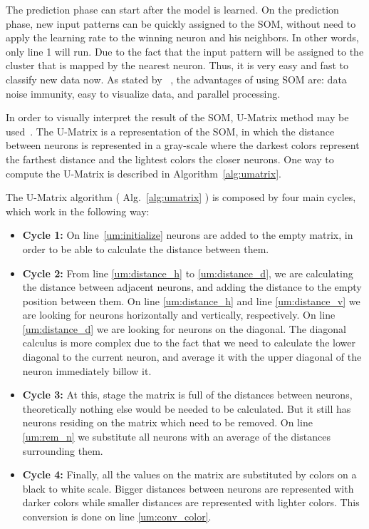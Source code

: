 The prediction phase can start after the model is learned. On the prediction phase, new input patterns can be quickly assigned to the \ac{SOM}, without need to apply the learning rate to the winning neuron and his neighbors. In other words, only line 1 will run. Due to the fact that the input pattern will be assigned to the cluster that is mapped by the nearest neuron. Thus, it is very easy and fast to classify new data now. As stated by ~\citet{Liu2012b}, the advantages of using \ac{SOM} are: data noise immunity, easy to visualize data, and parallel processing.

In order to visually interpret the result of the \ac{SOM}, \ac{U-Matrix} method may be used~\citep{Bacao2005}. The \ac{U-Matrix} is a representation of the \ac{SOM}, in which the distance between neurons is represented in a gray-scale where the darkest colors represent the farthest distance and the lightest colors the closer neurons. One way to compute the \ac{U-Matrix} is described in Algorithm~\ref{alg:umatrix}. 



The \ac{U-Matrix} algorithm ( Alg.~\ref{alg:umatrix} ) is composed by four main cycles, which work in the following way:

\begin{itemize}
  \item \textbf{Cycle 1: } On line~\ref{um:initialize} neurons are added to the empty matrix, in order to be able to calculate the distance between them.
  \item \textbf{Cycle 2:} From line \ref{um:distance_h} to \ref{um:distance_d}, we are calculating the distance between adjacent neurons, and adding the distance to the empty position between them. On line \ref{um:distance_h} and line \ref{um:distance_v} we are looking for neurons horizontally and vertically, respectively. On line \ref{um:distance_d} we are looking for neurons on the diagonal. The diagonal calculus is more complex due to the fact that we need to calculate the lower diagonal to the current neuron, and average it with the upper diagonal of the neuron immediately billow it.
    \item \textbf{Cycle 3: }At this, stage the matrix is full of the distances between neurons, theoretically nothing else would be needed to be calculated. But it still has neurons residing on the matrix which need to be removed. On line \ref{um:rem_n} we substitute all neurons with an average of the distances surrounding them.
    \item \textbf{Cycle 4:}  Finally, all the values on the matrix are substituted by colors on a black to white scale. Bigger distances between neurons are represented with darker colors while smaller distances are represented with lighter colors. This conversion is done on line \ref{um:conv_color}.
  
\end{itemize}

